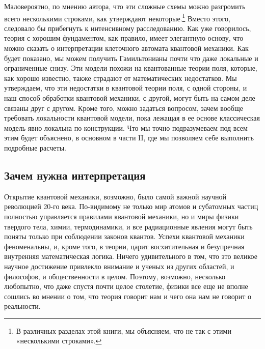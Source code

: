 \documentclass[main.tex]{subfiles}
\begin{document}
Маловероятно, по мнению автора, что эти сложные схемы можно разгромить всего несколькими строками, как утверждают некоторые.\footnote{В различных разделах этой книги, мы объясняем, что не так с этими «несколькими строками».} Вместо этого, следовало бы прибегнуть к интенсивному расследованию. Как уже говорилось, теория с хорошим фундаментом, как правило, имеет элегантную основу, что можно сказать о интерпретации клеточного автомата квантовой механики. Как будет показано, мы можем получить Гамильтонианы почти что даже локальные и ограниченные снизу. Эти модели похожи на квантованные теории поля, которые, как хорошо известно, также страдают от математических недостатков. Мы утверждаем, что эти недостатки в квантовой теории поля, с одной стороны, и наш способ обработки квантовой механики, с другой, могут быть на самом деле связаны друг с другом. Кроме того, можно задаться вопросом, зачем вообще требовать локальности квантовой модели, пока лежащая в ее основе классическая модель явно локальна по конструкции. Что мы точно подразумеваем под всем этим будет объяснено, в основном в части II, где мы позволяем себе выполнить подробные расчеты.

\subsection{Зачем нужна интерпретация}\label{ch1.1}

Открытие квантовой механики, возможно, было самой важной научной революцией 20-го века. По-видимому не только мир атомов и субатомных частиц полностью управляется правилами квантовой механики, но и миры физики твердого тела, химии, термодинамики, и все радиационные явления могут быть поняты только при соблюдении законов квантов. Успехи квантовой механики феноменальны, и, кроме того, в теории, царит восхитительная и безупречная внутренняя математическая логика. Ничего удивительного в том, что это великое научное достижение привлекло внимание и ученых из других областей, и философов, и общественности в целом. Поэтому, возможно, несколько любопытно, что даже спустя почти целое столетие, физики все еще не вполне сошлись во мнении о том, что теория говорит нам и чего она нам не говорит о реальности. 
\end{document}
